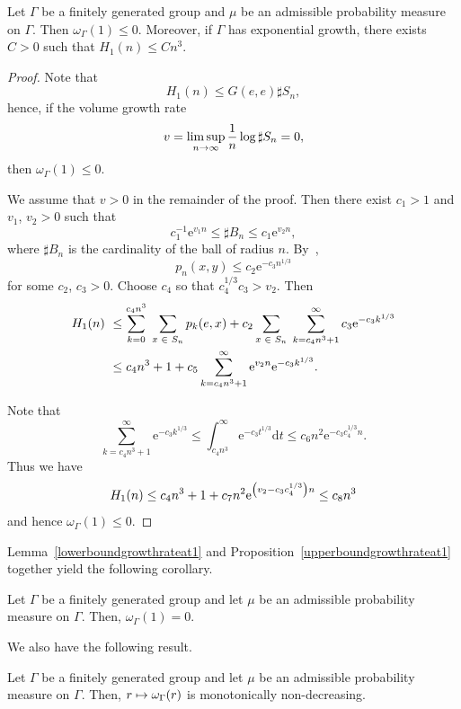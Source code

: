 \documentclass[10pt]{amsart}
\theoremstyle{definition}\newtheorem{defi}[theo]{Definition}\newtheorem{rema}[theo]{Remark}\newtheorem{exam}[theo]{Example}\newtheorem{exem}[theo]{Example}\newtheorem{nota}[theo]{Notation}
\newcommand{\rme}{\mathrm{e}}
\newcommand{\rmd}{\mathrm{d}}
\let\originalleft\left
\let\originalright\right
\renewcommand{\left}{\mathopen{}\mathclose\bgroup\originalleft}
\renewcommand{\right}{\aftergroup\egroup\originalright}
\let\oldin\in
\renewcommand{\in}{\mathchoice{\oldin}{\oldin}{\,\oldin\,}{\,\oldin\,}}
\renewcommand*{\to}{\mathchoice{\longrightarrow}{\rightarrow}{\rightarrow}{\rightarrow}}
\let\oldmapsto\mapsto
\renewcommand*{\mapsto}{\mathchoice{\longmapsto}{\oldmapsto}{\oldmapsto}{\oldmapsto}}
\begin{document}
\begin{prop}\label{upperboundgrowthrateat1}
Let $\Gamma$ be a finitely generated group and $\mu$ be an admissible probability measure on $\Gamma$. Then $\omega_{\Gamma}(1) \leq 0$. Moreover, if $\Gamma$ has exponential growth, there exists $C>0$ such that $H_1(n)\leq C n^{3}$.
\end{prop}

\begin{proof}
Note that
\[
H_1(n) \leq G(e, e) \sharp S_n,
\]
hence, if the volume growth rate
\[
v = \limsup_{n \to \infty} \frac{1}{n} \log \sharp S_n = 0,
\]
then $\omega_{\Gamma}(1) \leq 0$.

We assume that $v > 0$ in the remainder of the proof. Then there exist $c_1 > 1$ and $v_1$, $v_2 > 0$ such that
\begin{equation}\label{hksubexp}
c_1^{-1} \rme^{v_1 n} \leq \sharp B_n \leq c_1 \rme^{v_2 n},
\end{equation}
where $\sharp B_n$ is the cardinality of the ball of radius $n$. By~\cite[Theorem~1]{V91},
\[
p_n(x, y) \leq c_2 \rme^{- c_3 n^{1/3}}
\]
for some $c_2$, $c_3 > 0$. Choose $c_4$ so that $c_4^{1/3} c_3 > v_2$. Then
\begin{align*}
H_1(n) &\ \leq \sum_{k = 0}^{c_4 n^3}\;\sum_{x \in S_n} p_k(e, x) + c_2\sum_{x \in S_n}\;\sum_{k= c_4 n^3+1}^{\infty} c_3 \rme^{- c_3 k^{1/3}}\\
&\ \leq c_4n^3 + 1 + c_5 \sum_{k = c_4 n^3+1}^{\infty} \rme^{v_2 n} \rme^{- c_3 k^{1/3}}.
\end{align*}


Note that
\[
\sum_{k = c_4 n^3+1}^{\infty} \rme^{- c_3 k^{1/3}} \leq \int_{c_4 n^3}^{\infty} \rme^{-c_3 t^{1/3}} \rmd t \leq c_6 n^{2} \rme^{- c_3 c_4^{1/3} n}.
\]
Thus we have
\[
H_1(n) \leq c_4 n^3 + 1+c_7 n^{2} \rme^{\left(v_2 - c_3 c_4^{1/3} \right) n} \leq c_8 n^3
\]
and hence $\omega_{\Gamma}(1) \leq 0$.
\end{proof}

Lemma~\ref{lowerboundgrowthrateat1} and Proposition~\ref{upperboundgrowthrateat1} together yield the following corollary.
\begin{coro}
Let $\Gamma$ be a finitely generated group and let $\mu$ be an admissible probability measure on $\Gamma$. Then, $\omega_\Gamma(1)=0$.
\end{coro}

We also have the following result.

\begin{prop}\label{omeganonincreasing}
Let $\Gamma$ be a finitely generated group and let $\mu$ be an admissible probability measure on $\Gamma$. Then, $r\mapsto\omega_\Gamma(r)$ is monotonically non-decreasing.
\end{prop}
\end{document}
